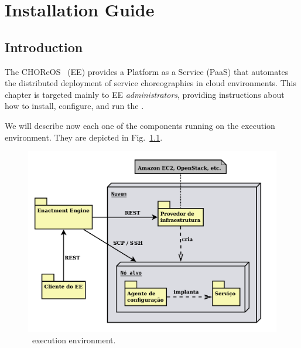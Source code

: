 
\chapter{Installation Guide}

\section{Introduction}

The CHOReOS \ee\ (EE) provides a Platform as a Service (PaaS) that automates the distributed deployment of service choreographies in cloud environments. This chapter is targeted mainly to EE \emph{administrators}, providing instructions about how to install, configure, and run the \ee.

We will describe now each one of the components running on the \ee execution environment. They are depicted in Fig.~\ref{fig:ee_components}. 

\begin{figure}
\centering
\includegraphics[scale=0.4]{img/components.pdf}
\caption{\ee\ execution environment. }
\label{fig:ee_components}
\end{figure}

